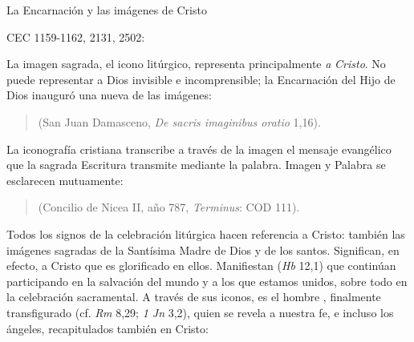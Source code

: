 	La Encarnación y las imágenes de Cristo
	
	CEC 1159-1162, 2131, 2502:
	
	 La imagen sagrada, el icono litúrgico, representa principalmente \emph{a} \emph{Cristo}. No puede representar a Dios invisible e incomprensible; la Encarnación del Hijo de Dios inauguró una nueva  de las imágenes:
	
	\begin{quote}
		 (San Juan Damasceno, \emph{De sacris imaginibus oratio} 1,16).
	\end{quote}

	
	 La iconografía cristiana transcribe a través de la imagen el mensaje evangélico que la sagrada Escritura transmite mediante la palabra. Imagen y Palabra se esclarecen mutuamente:
	
	\begin{quote}
		 (Concilio de Nicea II, año 787, \emph{Terminus}: COD 111).
	\end{quote}
	
	 Todos los signos de la celebración litúrgica hacen referencia a Cristo: también las imágenes sagradas de la Santísima Madre de Dios y de los santos. Significan, en efecto, a Cristo que es glorificado en ellos. Manifiestan  (\emph{Hb} 12,1) que continúan participando en la salvación del mundo y a los que estamos unidos, sobre todo en la celebración sacramental. A través de sus iconos, es el hombre , finalmente transfigurado  (cf. \emph{Rm} 8,29; \emph{1 Jn} 3,2), quien se revela a nuestra fe, e incluso los ángeles, recapitulados también en Cristo:
	
